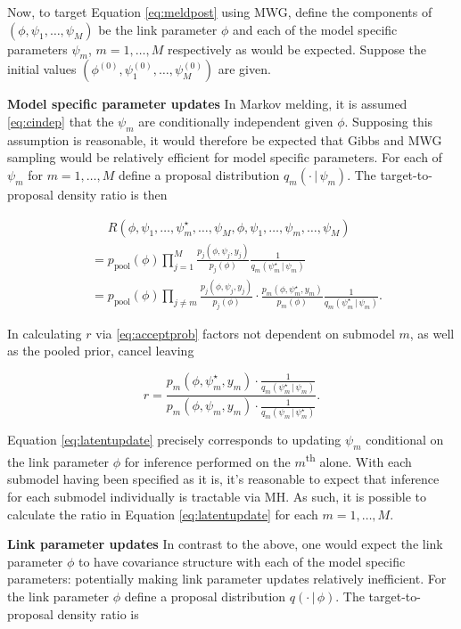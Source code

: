 \documentclass[11pt,]{book}
\begin{document}
Now, to target Equation \eqref{eq:meldpost} using MWG, define the
components of \((\phi, \psi_1, \ldots, \psi_M)\) be the link parameter
\(\phi\) and each of the model specific parameters \(\psi_m\),
\(m = 1, \ldots, M\) respectively as would be expected. Suppose the
initial values \((\phi^{(0)}, \psi_1^{(0)}, \ldots, \psi_M^{(0)})\) are
given.

\textbf{Model specific parameter updates} In Markov melding, it is
assumed \eqref{eq:cindep} that the \(\psi_m\) are conditionally
independent given \(\phi\). Supposing this assumption is reasonable, it
would therefore be expected that Gibbs and MWG sampling would be
relatively efficient for model specific parameters. For each of
\(\psi_m\) for \(m = 1, \ldots, M\) define a proposal distribution
\(q_m(\cdot \, | \, \psi_m)\). The target-to-proposal density ratio is
then

\begin{align}
&\phantom{=} R(\phi, \psi_1, \ldots, \psi_m^\star, \ldots, \psi_M, \phi, \psi_1, \ldots, \psi_m, \ldots, \psi_M) \nonumber \\
&= p_{\mathrm{pool}}(\phi) \prod_{j=1}^M \frac{p_j(\phi, \psi_j, y_j)}{p_j(\phi)} \frac{1}{q_m(\psi_m^\star \, | \, \psi_m)} \nonumber \\
&= p_{\mathrm{pool}}(\phi) \prod_{j\neq m} \frac{p_j(\phi, \psi_j, y_j)}{p_j(\phi)} \cdot \frac{p_m(\phi, \psi_m^\star, y_m)}{p_m(\phi)} \frac{1}{q_m(\psi_m^\star \, | \, \psi_m)}.
\end{align}

In calculating \(r\) via \eqref{eq:acceptprob} factors not dependent on
submodel \(m\), as well as the pooled prior, cancel leaving

\begin{equation}
r = \frac{p_m(\phi, \psi_m^\star, y_m) \cdot \frac{1}{q_m(\psi_m^\star \, | \, \psi_m)}}{p_m(\phi, \psi_m, y_m) \cdot \frac{1}{q_m(\psi_m \, | \, \psi_m^\star)}}. \label{eq:latentupdate}
\end{equation}

Equation \eqref{eq:latentupdate} precisely corresponds to updating
\(\psi_m\) conditional on the link parameter \(\phi\) for inference
performed on the \(m\)\textsuperscript{th} alone. With each submodel
having been specified as it is, it's reasonable to expect that inference
for each submodel individually is tractable via MH. As such, it is
possible to calculate the ratio in Equation \eqref{eq:latentupdate} for
each \(m = 1, \ldots, M\).

\textbf{Link parameter updates} In contrast to the above, one would
expect the link parameter \(\phi\) to have covariance structure with
each of the model specific parameters: potentially making link parameter
updates relatively inefficient. For the link parameter \(\phi\) define a
proposal distribution \(q(\cdot \, | \, \phi)\). The target-to-proposal
density ratio is
\end{document}
